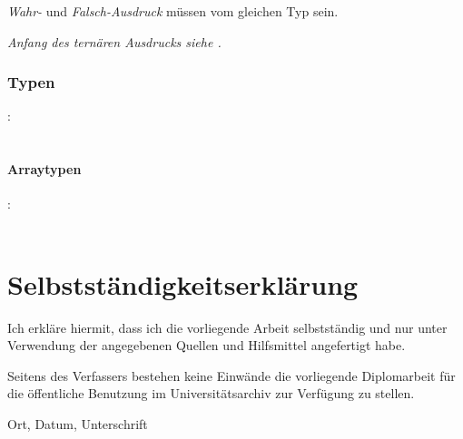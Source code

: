 \documentclass[twoside,a4paper,fleqn,12pt]{book}
\begin{document}
\emph{Wahr-} und \emph{Falsch-Ausdruck} müssen vom gleichen Typ sein.

\emph{Anfang des ternären Ausdrucks siehe .}

\subsection{Typen}

:\label{typ}\\
\hspace*{1cm} \Gspace{}\\

\subsubsection{Arraytypen}
:\label{typ_suffix_array}\\
\hspace*{1cm}\Gt{[}\Gspace\Gt{]}\Gspace{}\\

\printglossaries



\chapter*{Selbstständigkeitserklärung}

Ich erkläre hiermit, dass ich die vorliegende Arbeit selbstständig und nur unter Verwendung der angegebenen Quellen und Hilfsmittel angefertigt habe.

Seitens des Verfassers bestehen keine Einwände die vorliegende Diplomarbeit für die öffentliche Benutzung im Universitätsarchiv zur Verfügung zu stellen. 

\vspace{7em}
Ort, Datum, Unterschrift
\end{document}
